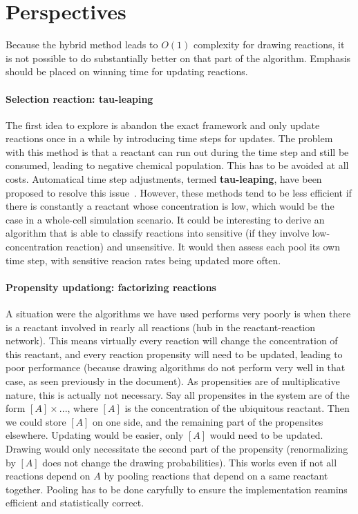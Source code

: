 \section {Perspectives}

Because the hybrid method leads to $O(1)$ complexity for drawing reactions, it is not possible to do substantially better on that part of the algorithm. Emphasis should be placed on winning time for updating reactions.

\paragraph{Selection reaction: tau-leaping} The first idea to explore is abandon the exact framework and only update reactions once in a while by introducing time steps for updates. The problem with this method is that a reactant can run out during the time step and still be consumed, leading to negative chemical population. This has to be avoided at all costs. Automatical time step adjustments, termed \textbf{tau-leaping}, have been proposed to resolve this issue~\citep{cao_avoiding_2005}. However, these methods tend to be less efficient if there is constantly a reactant whose concentration is low, which would be the case in a whole-cell simulation scenario. It could be interesting to derive an algorithm that is able to classify reactions into sensitive (if they involve low-concentration reaction) and unsensitive. It would then assess each pool its own time step, with sensitive reacion rates being updated more often.

\paragraph{Propensity updationg: factorizing reactions} A situation were the algorithms we have used performs very poorly is when there is a reactant involved in rearly all reactions (hub in the reactant-reaction network). This means virtually every reaction will change the concentration of this reactant, and every reaction propensity will need to be updated, leading to poor performance (because drawing algorithms do not perform very well in that case, as seen previously in the document). As propensities are of multiplicative nature, this is actually not necessary. Say all propensites in the system are of the form $[A]\times ...$, where $[A]$ is the concentration of the ubiquitous reactant. Then we could store $[A]$ on one side, and the remaining part of the propensites elsewhere. Updating would be easier, only $[A]$ would need to be updated. Drawing would only necessitate the second part of the propensity (renormalizing by $[A]$ does not change the drawing probabilities). This works even if not all reactions depend on $A$ by pooling reactions that depend on a same reactant together. Pooling has to be done caryfully to ensure the implementation reamins efficient and statistically correct.

